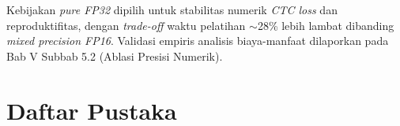 \documentclass[12pt,a4paper]{book}
\begin{document}
Kebijakan \textit{pure FP32} dipilih untuk stabilitas numerik \textit{CTC loss} dan reproduktifitas, dengan \textit{trade-off} waktu pelatihan $\sim$28\% lebih lambat dibanding \textit{mixed precision FP16}. Validasi empiris analisis biaya-manfaat dilaporkan pada Bab V Subbab 5.2 (Ablasi Presisi Numerik).





\chapter*{Daftar Pustaka}
\end{document}
